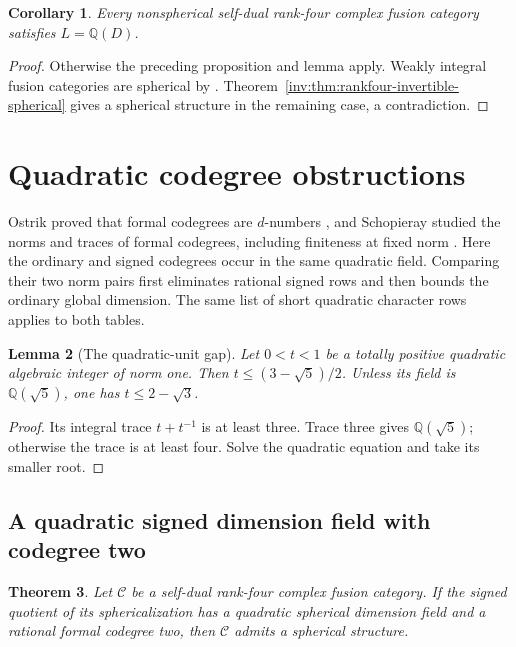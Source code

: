 \documentclass[11pt,a4paper]{article}
\newtheorem{theorem}{Theorem}[section]
\newtheorem{lemma}[theorem]{Lemma}
\newtheorem{corollary}[theorem]{Corollary}
\theoremstyle{definition}\newtheorem{definition}[theorem]{Definition}
\theoremstyle{remark}\newtheorem{remark}[theorem]{Remark}
\newcommand{\C}{\mathcal C}
\newcommand{\Q}{\mathbb Q}
\numberwithin{equation}{section}
\begin{document}
\begin{corollary}\label{col:cor:rank-four-dimension-field-descent}
Every nonspherical self-dual rank-four complex fusion category
satisfies $L=\Q(D)$.
\end{corollary}
\begin{proof}
Otherwise the preceding proposition and lemma apply. Weakly integral
fusion categories are spherical by \cite[Proposition~8.24]{ENO}.
Theorem~\ref{inv:thm:rankfour-invertible-spherical} gives a spherical
structure in the remaining case, a contradiction.
\end{proof}

\section{Quadratic codegree obstructions}\label{sec:quad}
Ostrik proved that formal codegrees are $d$-numbers \cite{OstrikCodegrees},
and Schopieray studied the norms and traces of formal codegrees,
including finiteness at fixed norm \cite{SchopierayNorm}. Here the
ordinary and signed codegrees occur in the same quadratic field.
Comparing their two norm pairs first eliminates rational signed rows
and then bounds the ordinary global dimension. The same list of short
quadratic character rows applies to both tables.

\begin{lemma}[The quadratic-unit gap]\label{quad:lem:unit-gap}
Let $0<t<1$ be a totally positive quadratic algebraic integer of norm
one. Then $t\le(3-\sqrt5)/2$. Unless its field is
$\Q(\sqrt5)$, one has $t\le2-\sqrt3$.
\end{lemma}
\begin{proof}
Its integral trace $t+t^{-1}$ is at least three. Trace three gives
$\Q(\sqrt5)$; otherwise the trace is at least four. Solve the
quadratic equation and take its smaller root.
\end{proof}

\subsection{A quadratic signed dimension field with codegree two}

\begin{theorem}\label{quad:thm:quadratic-signed-codegree-two}
Let $\C$ be a self-dual rank-four complex fusion category.
If the signed quotient of its sphericalization has a quadratic
spherical dimension field and a rational formal codegree two, then
$\C$ admits a spherical structure.
\end{theorem}
\end{document}
